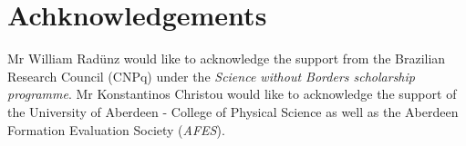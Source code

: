 \documentclass[preprint,authoryear,12pt]{elsarticle}
\begin{document}

\section{Achknowledgements}
Mr William Rad\"unz would like to acknowledge the support from the Brazilian Research Council (CNPq) under the \textit{Science without Borders scholarship programme}. Mr Konstantinos Christou would like to acknowledge the support of the University of Aberdeen - College of Physical Science as well as the Aberdeen Formation Evaluation Society (\textit{AFES}). 


\clearpage
\listoffigures

\clearpage 


\end{document}
